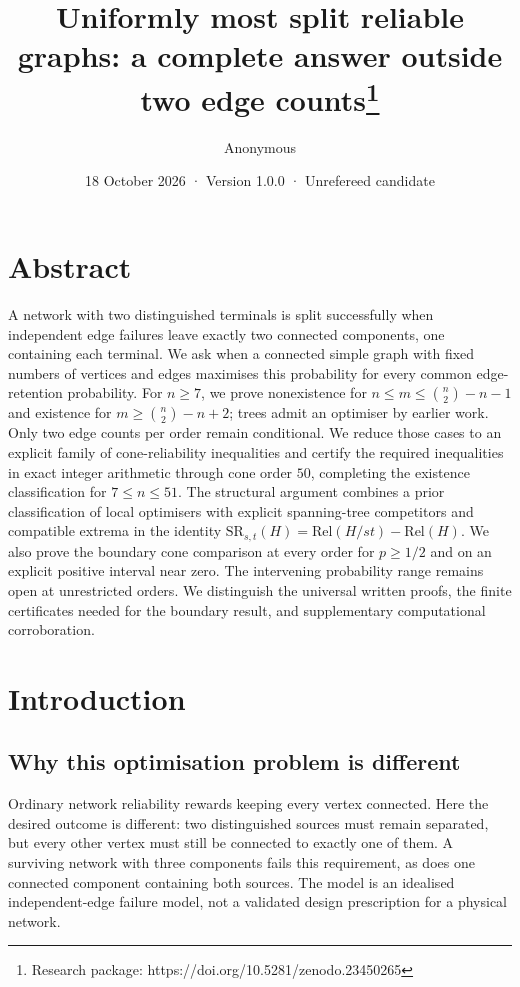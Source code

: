 \documentclass[
  11pt,
]{article}
\title{Uniformly most split reliable graphs: a complete answer outside
two edge counts\thanks{Research package:
https://doi.org/10.5281/zenodo.23450265}}
\author{Anonymous}
\date{18 October 2026 · Version 1.0.0 · Unrefereed candidate}
\newcounter{none} %
\theoremstyle{definition}
\theoremstyle{remark}
\begin{document}
\maketitle

\section*{Abstract}\label{abstract}

A network with two distinguished terminals is split successfully when
independent edge failures leave exactly two connected components, one
containing each terminal. We ask when a connected simple graph with
fixed numbers of vertices and edges maximises this probability for every
common edge-retention probability. For \(n\ge7\), we prove nonexistence
for \(n\le m\le\binom n2-n-1\) and existence for \(m\ge\binom n2-n+2\);
trees admit an optimiser by earlier work. Only two edge counts per order
remain conditional. We reduce those cases to an explicit family of
cone-reliability inequalities and certify the required inequalities in
exact integer arithmetic through cone order \(50\), completing the
existence classification for \(7\le n\le51\). The structural argument
combines a prior classification of local optimisers with explicit
spanning-tree competitors and compatible extrema in the identity
\(\mathrm{SR}_{s,t}(H)=\mathrm{Rel}(H/st)-\mathrm{Rel}(H)\). We also
prove the boundary cone comparison at every order for \(p\ge1/2\) and on
an explicit positive interval near zero. The intervening probability
range remains open at unrestricted orders. We distinguish the universal
written proofs, the finite certificates needed for the boundary result,
and supplementary computational corroboration.

\section{Introduction}\label{introduction}

\subsection{Why this optimisation problem is
different}\label{why-this-optimisation-problem-is-different}

Ordinary network reliability rewards keeping every vertex connected.
Here the desired outcome is different: two distinguished sources must
remain separated, but every other vertex must still be connected to
exactly one of them. A surviving network with three components fails
this requirement, as does one connected component containing both
sources. The model is an idealised independent-edge failure model, not a
validated design prescription for a physical network.
\end{document}
